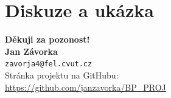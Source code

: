 \documentclass{beamer}
\makeatletter
\newcommand\FirstName{Jan}
\newcommand\LastName{Závorka}
\newcommand\Email{zavorja4@fel.cvut.cz}
\makeatother
\begin{document}
\section{Diskuze a ukázka}
\begin{frame}
\begin{center}
\vspace*{1cm}
{\bf Děkuji za pozonost!}\\
\vspace*{1.2cm}
{\bf\Large \FirstName{} \LastName{}}\\
{\tt \Email} \\[1em]
Stránka projektu na GitHubu: \\
\url{https://github.com/janzavorka/BP_PROJ}
\vspace*{1cm}
\end{center}
\end{frame}

\appendix
\end{document}
